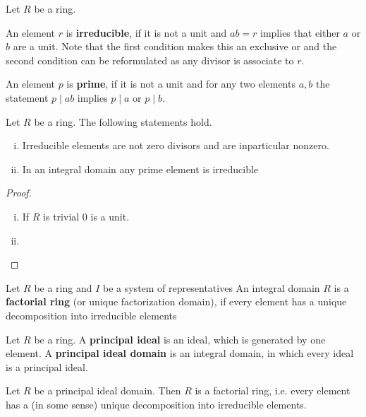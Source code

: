 	\begin{definition}
		Let $R$ be a ring. 

		An element $r$ is \textbf{irreducible}, if it is not a unit and $ab = r$ implies that either $a$ or $b$ are a unit. Note that the first condition makes this an exclusive or and the second condition can be reformulated as any divisor is associate to $r$.

		An  element $p$ is \textbf{prime}, if it is not a unit and for any two elements $a,b$ the statement $p \mid ab$ implies $p \mid a$ or $p \mid b$.
	\end{definition}

	\begin{lemma}
		Let $R$ be a ring. The following statements hold.
		\begin{enumerate}[(i)]
			\item{
				Irreducible elements are not zero divisors and are inparticular nonzero.
			}
			\item{
				In an integral domain any prime element is irreducible
			}
		\end{enumerate}
	\end{lemma}
	\begin{proof}
		\begin{enumerate}[(i)]
			\item{
				If $R$ is trivial $0$ is a unit.
			}
			\item{

			}
		\end{enumerate}
	\end{proof}

	\begin{definition}
		Let $R$ be a ring and $I$ be a system of representatives
		An integral domain $R$ is a \textbf{factorial ring} (or unique factorization domain), if every element has a unique decomposition into irreducible elements
	\end{definition}

	\begin{definition}
		Let $R$ be a ring. A \textbf{principal ideal} is an ideal, which is generated by one element. A \textbf{principal ideal domain} is an integral domain, in which every ideal is a principal ideal.
	\end{definition}

	\begin{theorem}
		Let $R$ be a principal ideal domain. Then $R$ is a factorial ring, i.e. every element has a (in some sense) unique decomposition into irreducible elements.
	\end{theorem}

